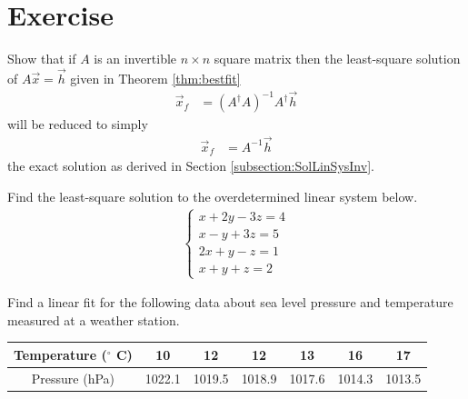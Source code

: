\section{Exercise}

\begin{Exercise}
Show that if $A$ is an invertible $n \times n$ square matrix then the least-square solution of $A\vec{x} = \vec{h}$ given in Theorem \ref{thm:bestfit}
\begin{align*}
\vec{x}_f &= (A^\dag A)^{-1}A^\dag \vec{h}    
\end{align*}
will be reduced to simply
\begin{align*}
\vec{x}_f &= A^{-1}\vec{h}    
\end{align*}
the exact solution as derived in Section \ref{subsection:SolLinSysInv}.
\end{Exercise}

\begin{Exercise}
Find the least-square solution to the overdetermined linear system below.
\begin{align*}
\begin{cases}
x + 2y - 3z = 4 \\
x - y + 3z = 5 \\
2x + y - z = 1 \\
x + y + z = 2
\end{cases}
\end{align*}
\end{Exercise}

\begin{Exercise}
Find a linear fit for the following data about sea level pressure and temperature measured at a weather station.
\begin{center}
\begin{tabular}{|c|c|c|c|c|c|c|}
\hline
Temperature ($^\circ$ C) & 10 & 12 & 12 & 13 & 16 & 17\\
\hline
Pressure (hPa) & 1022.1 & 1019.5 & 1018.9 & 1017.6 & 1014.3 & 1013.5\\
\hline
\end{tabular}
\end{center}
\end{Exercise}


